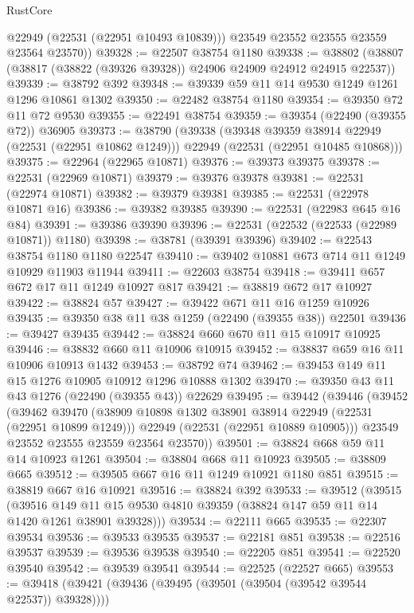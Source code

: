 \begin{lexlean}{RustCore}
\begin{coremodule}
          @22949
          (@22531 (@22951 @10493 @10839)))
        @23549
        @23552
        @23555
        @23559
        @23564
        @23570))
@39328 := @22507 @38754 @1180
@39338 := @38802 (@38807 (@38817 (@38822 (@39326 @39328)) @24906 @24909 @24912 @24915 @22537))
@39339 := @38792 @392
@39348 := @39339 @59 @11 @14 @9530 @1249 @1261 @1296 @10861 @1302
@39350 := @22482 @38754 @1180
@39354 := @39350 @72 @11 @72 @9530
@39355 := @22491 @38754
@39359 := @39354 (@22490 (@39355 @72)) @36905
@39373 := @38790
    (@39338
      (@39348 @39359 @38914 @22949 (@22531 (@22951 @10862 @1249)))
      @22949
      (@22531 (@22951 @10485 @10868)))
@39375 := @22964 (@22965 @10871)
@39376 := @39373 @39375
@39378 := @22531 (@22969 @10871)
@39379 := @39376 @39378
@39381 := @22531 (@22974 @10871)
@39382 := @39379 @39381
@39385 := @22531 (@22978 @10871 @16)
@39386 := @39382 @39385
@39390 := @22531 (@22983 @645 @16 @84)
@39391 := @39386 @39390
@39396 := @22531 (@22532 (@22533 (@22989 @10871)) @1180)
@39398 := @38781 (@39391 @39396)
@39402 := @22543 @38754 @1180 @1180 @22547
@39410 := @39402 @10881 @673 @714 @11 @1249 @10929 @11903 @11944
@39411 := @22603 @38754
@39418 := @39411 @657 @672 @17 @11 @1249 @10927 @817
@39421 := @38819 @672 @17 @10927
@39422 := @38824 @57
@39427 := @39422 @671 @11 @16 @1259 @10926
@39435 := @39350 @38 @11 @38 @1259 (@22490 (@39355 @38)) @22501
@39436 := @39427 @39435
@39442 := @38824 @660 @670 @11 @15 @10917 @10925
@39446 := @38832 @660 @11 @10906 @10915
@39452 := @38837 @659 @16 @11 @10906 @10913 @1432
@39453 := @38792 @74
@39462 := @39453 @149 @11 @15 @1276 @10905 @10912 @1296 @10888 @1302
@39470 := @39350 @43 @11 @43 @1276 (@22490 (@39355 @43)) @22629
@39495 := @39442
    (@39446
      (@39452
        (@39462
          @39470
          (@38909 @10898 @1302 @38901 @38914 @22949 (@22531 (@22951 @10899 @1249)))
          @22949
          (@22531 (@22951 @10889 @10905)))
        @23549
        @23552
        @23555
        @23559
        @23564
        @23570))
@39501 := @38824 @668 @59 @11 @14 @10923 @1261
@39504 := @38804 @668 @11 @10923
@39505 := @38809 @665
@39512 := @39505 @667 @16 @11 @1249 @10921 @1180 @851
@39515 := @38819 @667 @16 @10921
@39516 := @38824 @392
@39533 := @39512
    (@39515
      (@39516 @149 @11 @15 @9530 @4810 @39359 (@38824 @147 @59 @11 @14 @1420 @1261 @38901 @39328)))
@39534 := @22111 @665
@39535 := @22307 @39534
@39536 := @39533 @39535
@39537 := @22181 @851
@39538 := @22516 @39537
@39539 := @39536 @39538
@39540 := @22205 @851
@39541 := @22520 @39540
@39542 := @39539 @39541
@39544 := @22525 (@22527 @665)
@39553 := @39418 (@39421 (@39436 (@39495 (@39501 (@39504 (@39542 @39544 @22537)) @39328))))

\end{coremodule}
\end{lexlean}
